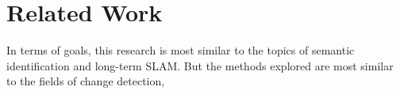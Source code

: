 \section{Related Work}
\label{sec:related_work}

In terms of goals, this research is most similar to the topics of semantic identification and long-term SLAM. But the methods explored are most similar to the fields of change detection, 

% 